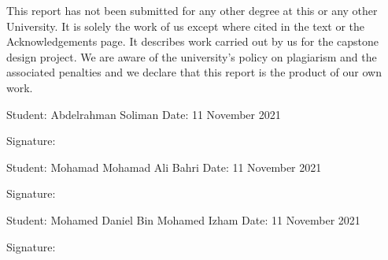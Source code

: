 \documentclass[../main.tex]{subfiles}
\begin{document}
This report has not been submitted for any other degree at this or any other University. 
It is solely the work of us except where cited in the text or the Acknowledgements page. 
It describes work carried out by us for the capstone design project. 
We are aware of the university’s policy on plagiarism and the associated penalties and 
we declare that this report is the product of our own work.

\vspace{2\baselineskip}

\noindent
Student: Abdelrahman Soliman \hfill Date: 11 November 2021

\medskip\noindent
Signature:

\vspace{2\baselineskip}

\noindent
Student: Mohamad Mohamad Ali Bahri \hfill Date: 11 November 2021

\medskip\noindent
Signature:

\vspace{2\baselineskip}

\noindent
Student: Mohamed Daniel Bin Mohamed Izham \hfill Date: 11 November 2021

\medskip\noindent
Signature:
\end{document}
